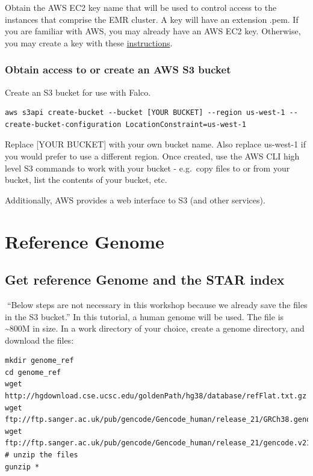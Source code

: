 \documentclass[
]{book}
\begin{document}
Obtain the AWS EC2 key name that will be used to control access to the instances that comprise the EMR cluster. A key will have an extension .pem. If you are familiar with AWS, you may already have an AWS EC2 key. Otherwise, you may create a key with these \href{https://docs.aws.amazon.com/elasticbeanstalk/latest/dg/create_deploy_NET.quickstart.html\#create-a-key-pair}{instructions}.

\hypertarget{obtain-access-to-or-create-an-aws-s3-bucket}{%
\subsection{Obtain access to or create an AWS S3 bucket}\label{obtain-access-to-or-create-an-aws-s3-bucket}}

Create an S3 bucket for use with Falco.

\begin{verbatim}
aws s3api create-bucket --bucket [YOUR BUCKET] --region us-west-1 --create-bucket-configuration LocationConstraint=us-west-1
\end{verbatim}

Replace {[}YOUR BUCKET{]} with your own bucket name. Also replace us-west-1 if you would prefer to use a different region. Once created, use the AWS CLI high level S3 commands to work with your bucket - e.g.~copy files to or from your bucket, list the contents of your bucket, etc.

Additionally, AWS provides a web interface to S3 (and other services).

\hypertarget{reference-genome}{%
\chapter{Reference Genome}\label{reference-genome}}

\hypertarget{get-reference-genome-and-the-star-index}{%
\section{Get reference Genome and the STAR index}\label{get-reference-genome-and-the-star-index}}

🔴``Below steps are not necessary in this workshop because we already save the files in the S3 bucket.''
In this tutorial, a human genome will be used. The file is \textasciitilde800M in size.
In a work directory of your choice, create a genome directory, and download the files:

\begin{verbatim}
mkdir genome_ref
cd genome_ref
wget http://hgdownload.cse.ucsc.edu/goldenPath/hg38/database/refFlat.txt.gz
wget ftp://ftp.sanger.ac.uk/pub/gencode/Gencode_human/release_21/GRCh38.genome.fa.gz
wget ftp://ftp.sanger.ac.uk/pub/gencode/Gencode_human/release_21/gencode.v21.chr_patch_hapl_scaff.annotation.gtf.gz
# unzip the files
gunzip *
\end{verbatim}
\end{document}
